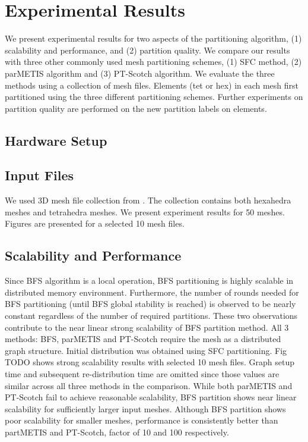 \documentclass[conference]{IEEEtran}
\begin{document}

\section{Experimental Results}
We present experimental results for two aspects of the partitioning algorithm, (1) scalability and performance, and (2) partition quality. We compare our results with three other commonly used mesh partitioning schemes, (1) SFC method, (2) parMETIS algorithm and (3) PT-Scotch algorithm. We evaluate the three methods using a collection of mesh files. Elements (tet or hex) in each mesh first partitioned using the three different partitioning schemes. Further experiments on partition quality are performed on the new partition labels on elements.

\subsection{Hardware Setup}

\subsection{Input Files}
We used 3D mesh file collection from \cite{meshes}. The collection contains both hexahedra meshes and tetrahedra meshes. We present experiment results for 50 meshes. Figures are presented for a selected 10 mesh files.

\subsection{Scalability and Performance}
Since BFS algorithm is a local operation, BFS partitioning is highly scalable in distributed memory environment. Furthermore, the number of rounds needed for BFS partitioning (until BFS global stability is reached) is observed to be nearly constant regardless of the number of required partitions. These two observations contribute to the near linear strong scalability of BFS partition method. All 3 methods: BFS, parMETIS and PT-Scotch require the mesh as a distributed graph structure. Initial distribution was obtained using SFC partitioning. Fig TODO shows strong scalability results with selected 10 mesh files. Graph setup time and subsequent re-distribution time are omitted since those values are similar across all three methods in the comparison. While both parMETIS and PT-Scotch fail to achieve reasonable scalability, BFS partition shows near linear scalability for sufficiently larger input meshes. Although BFS partition shows poor scalability for smaller meshes, performance is consistently better than partMETIS and PT-Scotch, factor of 10 and 100 respectively.
\end{document}
